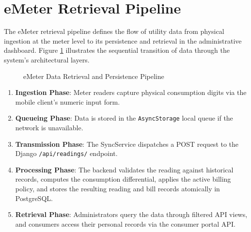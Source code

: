 \documentclass[12pt, a4paper, onecolumn]{report}
\begin{document}
\section{eMeter Retrieval Pipeline}
The eMeter retrieval pipeline defines the flow of utility data from physical ingestion at the meter level to its persistence and retrieval in the administrative dashboard. Figure \ref{fig:retrieval_pipeline} illustrates the sequential transition of data through the system's architectural layers.

\begin{figure}[htbp]
    \centering
    \caption{eMeter Data Retrieval and Persistence Pipeline}
    \label{fig:retrieval_pipeline}
\end{figure}
\begin{enumerate}
    \item \textbf{Ingestion Phase}: Meter readers capture physical consumption digits via the mobile client's numeric input form.
    \item \textbf{Queueing Phase}: Data is stored in the \texttt{AsyncStorage} local queue if the network is unavailable.
    \item \textbf{Transmission Phase}: The SyncService dispatches a POST request to the Django \texttt{/api/readings/} endpoint.
    \item \textbf{Processing Phase}: The backend validates the reading against historical records, computes the consumption differential, applies the active billing policy, and stores the resulting reading and bill records atomically in PostgreSQL.
    \item \textbf{Retrieval Phase}: Administrators query the data through filtered API views, and consumers access their personal records via the consumer portal API.
\end{enumerate}
\end{document}
